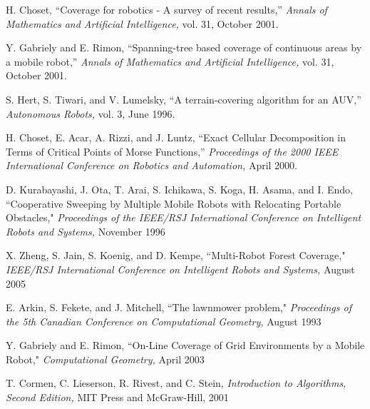\documentclass[letterpaper, 12pt, leqno]{report}
\begin{document}

\noindent [1] H. Choset, ``Coverage for robotics - A survey of recent results,'' \textit{Annals of \mbox{Mathematics} and Artificial Intelligence,} vol. 31, October 2001.

\noindent [2] Y. Gabriely and E. Rimon, ``Spanning-tree based coverage of continuous areas by a mobile robot,'' \textit{Annals of \mbox{Mathematics} and Artificial Intelligence,} vol. 31, October 2001.

\noindent [3] S. Hert, S. Tiwari, and V. Lumelsky, ``A terrain-covering algorithm for an AUV,'' \textit{Autonomous Robots,} vol. 3, June 1996.

\noindent [4] H. Choset, E. Acar, A. Rizzi, and J. Luntz, ``Exact Cellular Decomposition in Terms of Critical Points of Morse Functions,'' \textit{Proceedings of the 2000 IEEE International Conference on Robotics and Automation,} April 2000.

\noindent [5] D. Kurabayashi, J. Ota, T. Arai, S. Ichikawa, S. Koga, H. Asama, and I. Endo, ``Cooperative Sweeping by Multiple Mobile Robots with Relocating Portable Obstacles," \textit{Proceedings of the IEEE/RSJ International Conference on Intelligent Robots and Systems,} November 1996

\noindent [6] X. Zheng, S. Jain, S. Koenig, and D. Kempe, ``Multi-Robot Forest Coverage," \textit{IEEE/RSJ International Conference on Intelligent Robots and Systems,} August 2005

\noindent [7] E. Arkin, S. Fekete, and J. Mitchell, ``The lawnmower problem," \textit{Proceedings of the 5th Canadian Conference on Computational Geometry,} August 1993

\noindent [8] Y. Gabriely and E. Rimon, ``On-Line Coverage of Grid Environments by a Mobile Robot," \textit{Computational Geometry,} April 2003

\noindent [9] T. Cormen, C. Lieserson, R. Rivest, and C. Stein, \textit{Introduction to Algorithms, Second Edition,} MIT Press and McGraw-Hill, 2001
\end{document}
